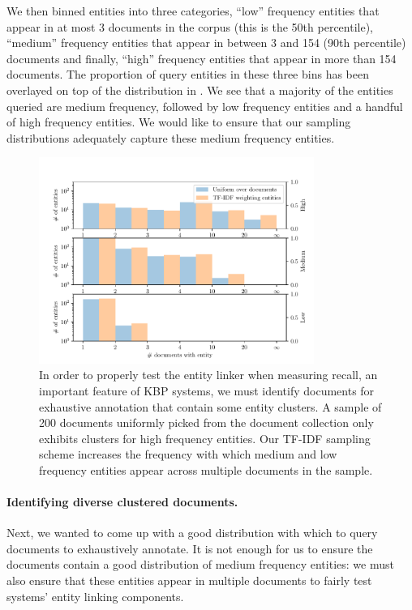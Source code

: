 We then binned entities into three categories, ``low'' frequency entities that appear in at most 3 documents in the corpus (this is the 50th percentile), ``medium'' frequency entities that appear in between 3 and 154 (90th percentile) documents and finally, ``high'' frequency entities that appear in more than 154 documents.
The proportion of query entities in these three bins has been overlayed on top of the distribution in .
We see that a majority of the entities queried are medium frequency, followed by low frequency entities and a handful of high frequency entities.
We would like to ensure that our sampling distributions adequately capture these medium frequency entities. 

\begin{figure}
  \centering
  \includegraphics[width=0.8\textwidth]{figures/analysis/exhaustive_entity_cross}
  \caption[Comparison of document sampling distributions]{\label{fig:kbpo:exhaustive-entity}
  In order to properly test the entity linker when measuring recall, an important feature of KBP systems, we must identify documents for exhaustive annotation that contain some entity clusters.
  A sample of 200 documents uniformly picked from the document collection only exhibits clusters for high frequency entities.
  Our TF-IDF sampling scheme increases the frequency with which medium and low frequency entities appear across multiple documents in the sample.
  }
\end{figure}


\paragraph{Identifying diverse clustered documents.}
Next, we wanted to come up with a good distribution with which to query documents to exhaustively annotate.
It is not enough for us to ensure the documents contain a good distribution of medium frequency entities: we must also ensure that these entities appear in multiple documents to fairly test systems' entity linking components.

